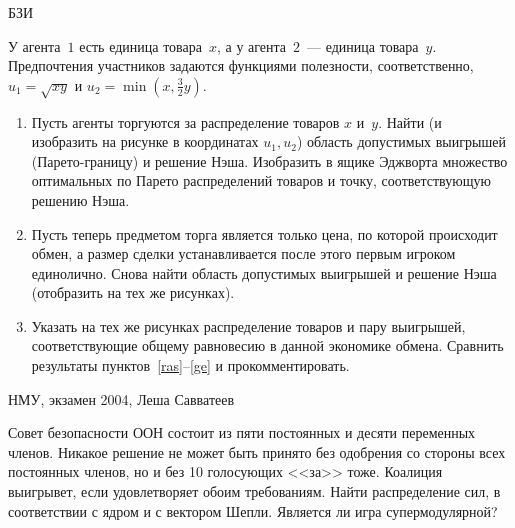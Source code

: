 \begin{problem}
\begin{source}
БЗИ
\end{source}
 У агента~$1$ есть единица
товара~$x$, а у агента~$2$~--- единица товара~$y$.
Предпочтения участников задаются функциями полезности,
соответственно, $u_1=\sqrt{xy}$ и
$u_2=\min\left(x,\frac{3}{2}y\right)$.

\begin{enumerate}

\item\label{ras} Пусть агенты торгуются за распределение
товаров $x$ и~$y$. Найти (и изобразить на рисунке в
координатах $u_1,u_2$) область допустимых выигрышей
(Парето-границу) и решение Нэша. Изобразить в ящике
Эджворта множество оптимальных по Парето распределений
товаров и точку, соответствующую решению Нэша.

\item\label{p} Пусть теперь предметом торга является только
цена, по которой происходит обмен, а размер сделки
устанавливается после этого первым игроком единолично.
Снова найти область допустимых выигрышей и решение Нэша
(отобразить на тех же рисунках).

\item\label{ge} Указать на тех же рисунках распределение
товаров и пару выигрышей, соответствующие общему равновесию
в данной экономике обмена. Сравнить результаты
пунктов~\ref{ras}--\ref{ge} и прокомментировать.

\end{enumerate}


\begin{sol}

\end{sol}
\end{problem}

\begin{problem}
\begin{source}
НМУ, экзамен 2004, Леша Савватеев
\end{source}
Совет безопасности ООН состоит из пяти постоянных и десяти переменных членов. Никакое решение не может быть принято без одобрения со стороны всех постоянных членов, но и без 10 голосующих <<за>> тоже. Коалиция выигрывет, если удовлетворяет обоим требованиям. Найти распределение сил, в соответствии с ядром и с вектором Шепли. Является ли игра супермодулярной?


\begin{sol}

\end{sol}
\end{problem}




